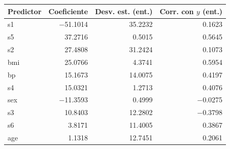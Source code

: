 \begin{tabular}{lrrr}
\toprule
Predictor & Coeficiente & Desv. est. (ent.) & Corr. con $y$ (ent.) \\
\midrule
s1 & $-$51.1014 & 35.2232 & 0.1623 \\
s5 & 37.2716 & 0.5015 & 0.5645 \\
s2 & 27.4808 & 31.2424 & 0.1073 \\
bmi & 25.0766 & 4.3741 & 0.5954 \\
bp & 15.1673 & 14.0075 & 0.4197 \\
s4 & 15.0321 & 1.2713 & 0.4076 \\
sex & $-$11.3593 & 0.4999 & $-$0.0275 \\
s3 & 10.8403 & 12.2802 & $-$0.3798 \\
s6 & 3.8171 & 11.4005 & 0.3867 \\
age & 1.1318 & 12.7451 & 0.2061 \\
\bottomrule
\end{tabular}
